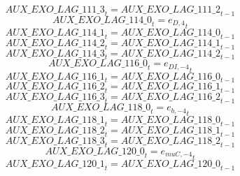 \begin{dmath}
{AUX\_EXO\_LAG\_111\_3}_{t}={AUX\_EXO\_LAG\_111\_2}_{t-1}
\end{dmath}
\begin{dmath}
{AUX\_EXO\_LAG\_114\_0}_{t}={{e_{D,4}}}_{t}
\end{dmath}
\begin{dmath}
{AUX\_EXO\_LAG\_114\_1}_{t}={AUX\_EXO\_LAG\_114\_0}_{t-1}
\end{dmath}
\begin{dmath}
{AUX\_EXO\_LAG\_114\_2}_{t}={AUX\_EXO\_LAG\_114\_1}_{t-1}
\end{dmath}
\begin{dmath}
{AUX\_EXO\_LAG\_114\_3}_{t}={AUX\_EXO\_LAG\_114\_2}_{t-1}
\end{dmath}
\begin{dmath}
{AUX\_EXO\_LAG\_116\_0}_{t}={{e_{DI,-4}}}_{t}
\end{dmath}
\begin{dmath}
{AUX\_EXO\_LAG\_116\_1}_{t}={AUX\_EXO\_LAG\_116\_0}_{t-1}
\end{dmath}
\begin{dmath}
{AUX\_EXO\_LAG\_116\_2}_{t}={AUX\_EXO\_LAG\_116\_1}_{t-1}
\end{dmath}
\begin{dmath}
{AUX\_EXO\_LAG\_116\_3}_{t}={AUX\_EXO\_LAG\_116\_2}_{t-1}
\end{dmath}
\begin{dmath}
{AUX\_EXO\_LAG\_118\_0}_{t}={{e_{b,-4}}}_{t}
\end{dmath}
\begin{dmath}
{AUX\_EXO\_LAG\_118\_1}_{t}={AUX\_EXO\_LAG\_118\_0}_{t-1}
\end{dmath}
\begin{dmath}
{AUX\_EXO\_LAG\_118\_2}_{t}={AUX\_EXO\_LAG\_118\_1}_{t-1}
\end{dmath}
\begin{dmath}
{AUX\_EXO\_LAG\_118\_3}_{t}={AUX\_EXO\_LAG\_118\_2}_{t-1}
\end{dmath}
\begin{dmath}
{AUX\_EXO\_LAG\_120\_0}_{t}={{e_{muC,-4}}}_{t}
\end{dmath}
\begin{dmath}
{AUX\_EXO\_LAG\_120\_1}_{t}={AUX\_EXO\_LAG\_120\_0}_{t-1}
\end{dmath}

